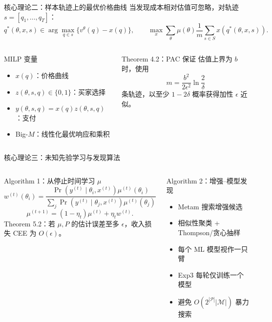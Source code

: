 \documentclass[aspectratio=169,10pt]{ctexbeamer}
\begin{document}
\begin{frame}{核心理论二：样本轨迹上的最优价格曲线}
当发现成本相对估值可忽略，对轨迹 $s=[q_1,\ldots,q_T]$：
\[
q^*(\theta,x,s)\in\arg\max_{q\in s}\{v^\theta(q)-x(q)\},
\qquad
\max_x\sum_\theta\mu(\theta)\frac1m\sum_{s\in S}x(q^*(\theta,x,s)).
\]
\begin{columns}[T,onlytextwidth]
\begin{block}{MILP 变量}
\begin{itemize}
  \item $x(q)$：价格曲线
  \item $z(\theta,s,q)\in\{0,1\}$：买家选择
  \item $y(\theta,s,q)=x(q)z(\theta,s,q)$：支付
  \item Big-$M$：线性化最优响应和乘积
\end{itemize}
\end{block}
\begin{block}{Theorem 4.2：PAC 保证}
估值上界为 $b$ 时，使用
\[
m=\frac{b^2}{2\epsilon^2}\ln\frac{2}{\delta}
\]
条轨迹，以至少 $1-2\delta$ 概率获得加性 $\epsilon$ 近似。
\end{block}
\end{columns}
\end{frame}

\begin{frame}{核心理论三：未知先验学习与发现算法}
\begin{columns}[T,onlytextwidth]
\begin{block}{Algorithm 1：从停止时间学习 $\mu$}
\small
\[
w^{(t)}(\theta_i)=
\frac{\Pr(y^{(t)}\mid\theta_i,x^{(t)})\mu^{(t)}(\theta_i)}
{\sum_j\Pr(y^{(t)}\mid\theta_j,x^{(t)})\mu^{(t)}(\theta_j)}
\]
\[
\mu^{(t+1)}=(1-\eta_t)\mu^{(t)}+\eta_tw^{(t)}.
\]
\normalsize
Theorem 5.2：若 $\mu,P$ 的估计误差至多 $\epsilon$，收入损失 CEE 为 $O(\epsilon)$。
\end{block}
\begin{block}{Algorithm 2：增强--模型发现}
\begin{itemize}
  \item Metam 搜索增强候选
  \item 相似性聚类 + Thompson/贪心抽样
  \item 每个 ML 模型视作一只臂
  \item Exp3 每轮仅训练一个模型
  \item 避免 $O(2^{|\mathcal P|}|\mathcal M|)$ 暴力搜索
\end{itemize}
\end{block}
\end{columns}
\end{frame}
\end{document}
